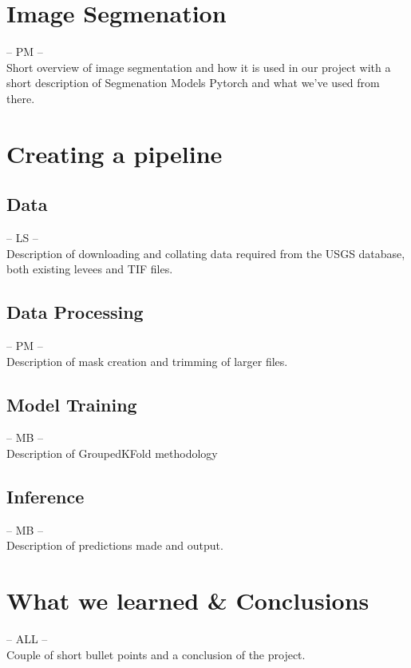 \documentclass[NOTE, disdraft=true, UKenglish]{\DISCDTLATEXPATH UCLCDTDISdoc}
\begin{document}
\section{Image Segmenation}
\label{sec:method}
%
-- PM --\\
Short overview of image segmentation and how it is used in our project with a short description of Segmenation Models Pytorch and what we've used from there.
\section{Creating a pipeline}
\label{sec:results}
%
\subsection{Data}
-- LS --\\
Description of downloading and collating data required from the USGS database, both existing levees and TIF files.
\subsection{Data Processing}
-- PM --\\
Description of mask creation and trimming of larger files.
\subsection{Model Training}
-- MB --\\
Description of GroupedKFold methodology
\subsection{Inference}
-- MB --\\
Description of predictions made and output.
\section{What we learned \& Conclusions}
\label{sec:conclusion}
%
-- ALL --\\
Couple of short bullet points and a conclusion of the project.
\end{document}
